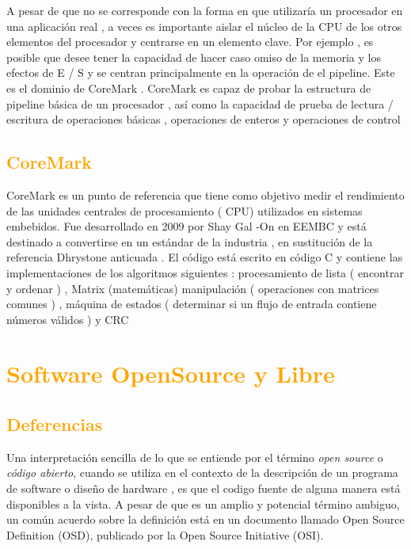 \documentclass[a4paper,11pt]{article}
\begin{document}
A pesar de que no se corresponde con la forma en que utilizaría un procesador en una aplicación real , a veces es importante aislar el núcleo de la CPU de los otros elementos del procesador y centrarse en un elemento clave. Por ejemplo , es posible que desee tener la capacidad de hacer caso omiso de la memoria y los efectos de E / S y se centran principalmente en la operación de el pipeline. Este es el dominio de CoreMark . CoreMark es capaz de probar la estructura de pipeline básica de un procesador , así como la capacidad de prueba de lectura / escritura de operaciones básicas , operaciones de enteros y operaciones de control

	\subsection{\textcolor{orange}{CoreMark}}

CoreMark es un punto de referencia que tiene como objetivo medir el rendimiento de las unidades centrales de procesamiento ( CPU) utilizados en sistemas embebidos. Fue desarrollado en 2009 por Shay Gal -On en EEMBC y está destinado a convertirse en un estándar de la industria , en sustitución de la referencia Dhrystone anticuada . El código está escrito en código C y contiene las implementaciones de los algoritmos siguientes : procesamiento de lista ( encontrar y ordenar ) , Matrix (matemáticas) manipulación ( operaciones con matrices comunes ) , máquina de estados ( determinar si un flujo de entrada contiene números válidos ) y CRC
\newpage

\section{\textcolor{orange}{Software OpenSource y Libre}}%
		\subsection{\textcolor{orange}{Deferencias}}%
Una interpretación sencilla de lo que se entiende por el término \textit {open source} o \textit{código abierto}, cuando se utiliza en el contexto de la descripción de un programa de software o diseño de hardware , es que el codigo fuente  de alguna manera está disponibles a la vista. A pesar de que es un amplio y potencial término ambiguo, un común acuerdo sobre la definición está en un documento llamado  Open Source Definition (OSD), publicado por la Open Source Initiative (OSI).
\end{document}
